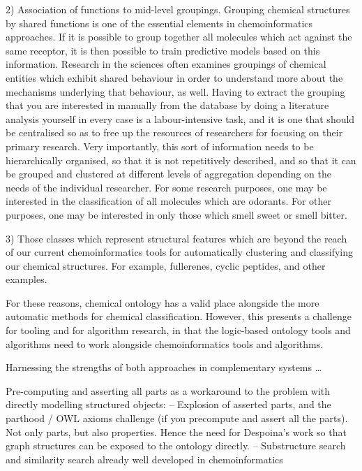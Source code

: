 \documentclass[10pt]{bmc_article}
\newenvironment{bmcformat}{\baselineskip20pt\sloppy\setboolean{publ}{false}}{\baselineskip20pt\sloppy}
\begin{document}
\begin{bmcformat}
2) Association of functions to mid-level groupings.  Grouping chemical structures by shared functions is one of the essential elements in chemoinformatics approaches.  If it is possible to group together all molecules which act against the same receptor, it is then possible to train predictive models based on this information.   %
Research in the sciences often examines groupings of chemical entities which exhibit shared behaviour in order to understand more about the mechanisms underlying that behaviour, as well. %
Having to extract the grouping that you are interested in manually from the database by doing a literature analysis yourself in every case is a labour-intensive task, and it is one that should be centralised so as to free up the resources of researchers for focusing on their primary research. 
Very importantly, this sort of information needs to be hierarchically organised, so that it is not repetitively described, and so that it can be grouped and clustered at different levels of aggregation depending on the needs of the individual researcher.  For some research purposes, one may be interested in the classification of all molecules which are odorants. For other purposes, one may be interested in only those which smell sweet or smell bitter. 

3) Those classes which represent structural features which are beyond the reach of our current chemoinformatics tools for automatically clustering and classifying our chemical structures. For example, fullerenes, cyclic peptides, and other examples. 

For these reasons, chemical ontology has a valid place alongside the more automatic methods for chemical classification.  However, this presents a challenge for tooling and for algorithm research, in that the logic-based ontology tools and algorithms need to work alongside chemoinformatics tools and algorithms. 


Harnessing the strengths of both approaches in complementary systems \ldots




Pre-computing and asserting all parts as a workaround to the problem with directly modelling structured objects: 
-- Explosion of asserted parts, and the parthood / OWL axioms challenge (if you precompute and assert all the parts). Not only parts, but also properties. Hence the need for Despoina's work so that graph structures can be exposed to the ontology directly. 
-- Substructure search and similarity search already well developed in chemoinformatics 






\end{bmcformat}
\end{document}
